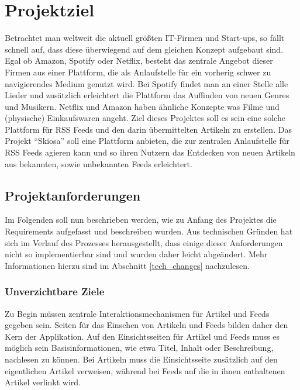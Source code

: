 
\chapter{Projektziel}

Betrachtet man weltweit die aktuell größten IT-Firmen und Start-ups, so fällt schnell auf, dass diese überwiegend auf dem gleichen Konzept aufgebaut sind.
Egal ob Amazon, Spotify oder Netflix, besteht das zentrale Angebot dieser Firmen aus einer Plattform, die als Anlaufstelle für ein vorherig schwer zu navigierendes Medium genutzt wird.
Bei Spotify findet man an einer Stelle alle Lieder und zusätzlich erleichtert die Plattform das Auffinden von neuen Genres und Musikern.
Netflix und Amazon haben ähnliche Konzepte was Filme und (physische) Einkaufswaren angeht.
Ziel dieses Projektes soll es sein eine solche Plattform für RSS Feeds und den darin übermittelten Artikeln zu erstellen.
Das Projekt \enquote{Skiosa} soll eine Plattform anbieten, die zur zentralen Anlaufstelle für RSS Feeds agieren kann und so ihren Nutzern das Entdecken von neuen Artikeln aus bekannten, sowie unbekannten Feeds erleichtert.

\section{Projektanforderungen}

Im Folgenden soll nun beschrieben werden, wie zu Anfang des Projektes die Requirements aufgefasst und beschreiben wurden.
Aus technischen Gründen hat sich im Verlauf des Prozesses herausgestellt, dass einige dieser Anforderungen nicht so implementierbar sind und wurden daher leicht abgeändert.
Mehr Informationen hierzu sind im Abschnitt \ref{tech_changes} nachzulesen.

\subsection{Unverzichtbare Ziele}
Zu Begin müssen zentrale Interaktionsmechanismen für Artikel und Feeds gegeben sein.
Seiten für das Einsehen von Artikeln und Feeds bilden daher den Kern der Applikation.
Auf den Einsichtsseiten für Artikel und Feeds muss es möglich sein Basisinformationen, wie etwa Titel, Inhalt oder Beschreibung, nachlesen zu können.
Bei Artikeln muss die Einsichtsseite zusätzlich auf den eigentlichen Artikel verweisen, während bei Feeds auf die in ihnen enthaltenen Artikel verlinkt wird.

